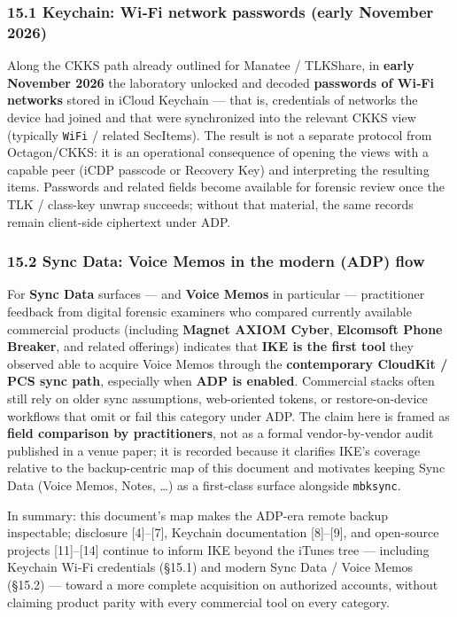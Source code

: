 \documentclass[
  english,
  10pt]{article}
\begin{document}
\subsubsection{15.1 Keychain: Wi‑Fi network passwords (early November
2026)}\label{keychain-wifi-network-passwords-early-november-2026}

Along the CKKS path already outlined for Manatee / TLKShare, in
\textbf{early November 2026} the laboratory unlocked and decoded
\textbf{passwords of Wi‑Fi networks} stored in iCloud Keychain --- that
is, credentials of networks the device had joined and that were
synchronized into the relevant CKKS view (typically \texttt{WiFi} /
related SecItems). The result is not a separate protocol from
Octagon/CKKS: it is an operational consequence of opening the views with
a capable peer (iCDP passcode or Recovery Key) and interpreting the
resulting items. Passwords and related fields become available for
forensic review once the TLK / class-key unwrap succeeds; without that
material, the same records remain client-side ciphertext under ADP.

\subsubsection{15.2 Sync Data: Voice Memos in the modern (ADP)
flow}\label{sync-data-voice-memos-in-the-modern-adp-flow}

For \textbf{Sync Data} surfaces --- and \textbf{Voice Memos} in
particular --- practitioner feedback from digital forensic examiners who
compared currently available commercial products (including
\textbf{Magnet AXIOM Cyber}, \textbf{Elcomsoft Phone Breaker}, and
related offerings) indicates that \textbf{IKE is the first tool} they
observed able to acquire Voice Memos through the \textbf{contemporary
CloudKit / PCS sync path}, especially when \textbf{ADP is enabled}.
Commercial stacks often still rely on older sync assumptions,
web-oriented tokens, or restore-on-device workflows that omit or fail
this category under ADP. The claim here is framed as \textbf{field
comparison by practitioners}, not as a formal vendor-by-vendor audit
published in a venue paper; it is recorded because it clarifies IKE's
coverage relative to the backup-centric map of this document and
motivates keeping Sync Data (Voice Memos, Notes, \ldots) as a
first-class surface alongside \texttt{mbksync}.

In summary: this document's map makes the ADP-era remote backup
inspectable; disclosure {[}4{]}--{[}7{]}, Keychain documentation
{[}8{]}--{[}9{]}, and open-source projects {[}11{]}--{[}14{]} continue
to inform IKE beyond the iTunes tree --- including Keychain Wi‑Fi
credentials (§15.1) and modern Sync Data / Voice Memos (§15.2) ---
toward a more complete acquisition on authorized accounts, without
claiming product parity with every commercial tool on every category.
\end{document}
